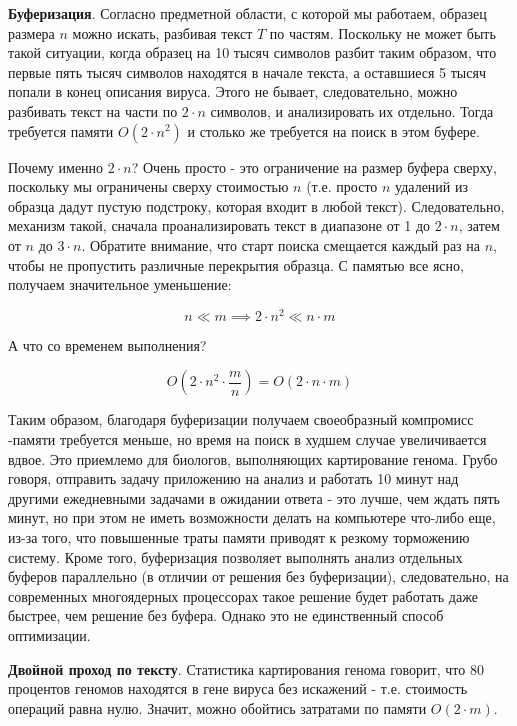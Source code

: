 \documentclass[11pt,a4paper,oneside]{article}
\begin{document}
\begin{heuristic}
	\textbf{Буферизация}. Согласно предметной области, с которой мы работаем, образец размера $n$ можно искать, разбивая текст $T$ по частям. Поскольку не может быть такой ситуации, когда образец на 10 тысяч символов разбит таким образом, что первые пять тысяч символов находятся в начале текста, а оставшиеся 5 тысяч попали в конец описания вируса. Этого не бывает, следовательно, можно разбивать текст на части по $2\cdot n$ символов, и анализировать их отдельно. Тогда требуется памяти $O(2\cdot n^2)$ и столько же требуется на поиск в этом буфере.
\end{heuristic}

Почему именно $2\cdot n$? Очень просто - это ограничение на размер буфера сверху, поскольку мы ограничены сверху стоимостью $n$ (т.е. просто $n$ удалений из образца дадут пустую подстроку, которая входит в любой текст). Следовательно, механизм такой, сначала проанализировать текст в диапазоне от 1 до $2\cdot n$, затем от $n$ до $3\cdot n$. Обратите внимание, что старт поиска смещается каждый раз на $n$, чтобы не пропустить различные перекрытия образца. С памятью все ясно, получаем значительное уменьшение:

\begin{equation}
	n\ll m\implies 2\cdot n^2\ll n\cdot m
\end{equation}

А что со временем выполнения?

\begin{equation}
    \label{eq:timebuffer}
	O(2\cdot n^2\cdot \frac{m}{n}) = O(2\cdot n\cdot m)
\end{equation}

Таким образом, благодаря буферизации получаем своеобразный компромисс -памяти требуется меньше, но время на поиск в худшем случае увеличивается вдвое. Это приемлемо для биологов, выполняющих картирование генома. Грубо говоря, отправить задачу приложению на анализ и работать 10 минут над другими ежедневными задачами в ожидании ответа - это лучше, чем ждать пять минут, но при этом не иметь возможности делать на компьютере что-либо еще, из-за того, что повышенные траты памяти приводят к резкому торможению систему. Кроме того, буферизация позволяет выполнять анализ отдельных буферов параллельно (в отличии от решения без буферизации), следовательно, на современных многоядерных процессорах такое решение будет работать даже быстрее, чем решение без буфера. Однако это не единственный способ оптимизации.

\begin{heuristic}
\textbf{Двойной проход по тексту}.
Статистика картирования генома говорит, что 80 процентов геномов находятся в гене вируса без искажений - т.е. стоимость операций равна нулю. Значит, можно обойтись затратами по памяти $O(2\cdot m)$.
\end{heuristic}
\end{document}
